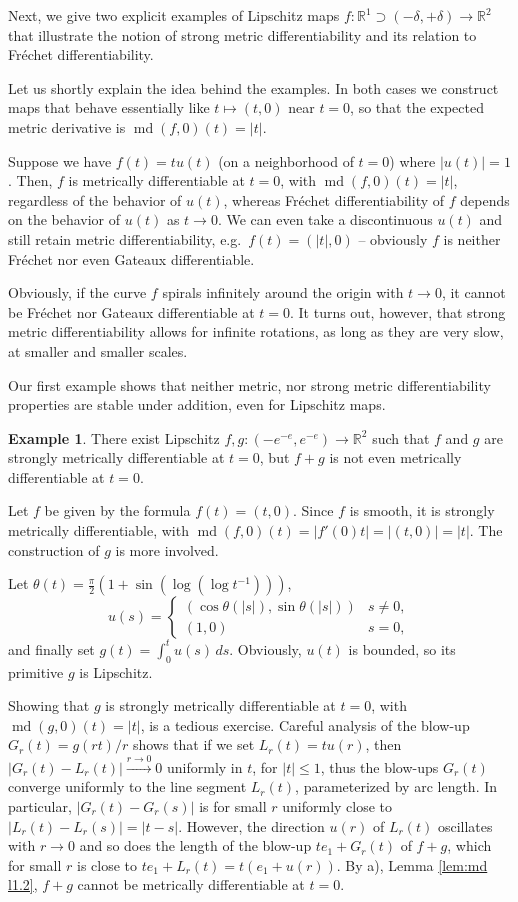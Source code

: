\documentclass[12pt,leqno]{amsart}
\theoremstyle{definition}
\newtheorem{example}[theorem]{Example}
\newcommand{\bbbr}{\mathbb R}
\def\md{\operatorname{md}}
\numberwithin{theorem}{section} \numberwithin{equation}{section}
\begin{document}
Next, we give two explicit examples of Lipschitz maps $f: \mathbb R^1 \supset (-\delta,+\delta) \to \mathbb R^2$ that illustrate the notion of strong metric differentiability and its relation to Fr\'echet differentiability.

Let us shortly explain the idea behind the examples. In both cases we construct maps that behave essentially like $t\mapsto (t,0)$ near $t=0$, so that the expected metric derivative is $\md(f,0)(t)=|t|$.

Suppose we have $f(t)=t u(t)$ (on a neighborhood of $t=0$) where $|u(t)|=1$. Then, $f$ is metrically differentiable at $t=0$, with $\md(f,0)(t)=|t|$, regardless of the behavior of $u(t)$, whereas Fr\'echet differentiability of $f$ depends on the behavior of $u(t)$ as $t \to 0$. We can even take a discontinuous $u(t)$ and still retain metric differentiability, e.g.\ $f(t)=(|t|,0)$ -- obviously $f$ is neither Fr\'echet nor even Gateaux differentiable.

Obviously, if the curve $f$ spirals infinitely around the origin with $t\to 0$, it cannot be Fr\'echet nor Gateaux differentiable at $t=0$.  It turns out, however, that strong metric differentiability allows for infinite rotations, as long as they are very slow, at smaller and smaller scales.

Our first example shows that
neither metric, nor strong metric differentiability properties are stable under addition, even for Lipschitz maps.
\begin{example}
There exist Lipschitz $f,g:(-e^{-e},e^{-e})\to\bbbr^2$ such that $f$ and $g$ are strongly metrically differentiable at $t=0$, but $f+g$ is not even metrically differentiable at $t=0$.

Let $f$ be given by the formula $f(t)=(t,0)$. Since $f$ is smooth, it is strongly metrically differentiable, with $\md(f,0)(t)=|f'(0)t|=|(t,0)|=|t|$.
    The construction of $g$ is more involved.

    Let $\theta(t)=\frac{\pi}{2}(1+\sin(\log(\log t^{-1})))$,
    $$
    u(s)=\begin{cases}\left(\cos\theta(|s|),\sin \theta(|s|)\right) & s\neq 0,\\
    (1,0) &s=0,\end{cases}
    $$
    and finally set $g(t)=\int_0^t u(s)\,ds$. Obviously, $u(t)$ is bounded, so its primitive $g$ is Lipschitz.

Showing that $g$ is strongly metrically differentiable at $t=0$, with $\md(g,0)(t)=|t|$, is a tedious exercise.  Careful analysis of the blow-up $G_r(t)=g(rt)/r$ shows that if we set $L_r(t)=tu(r)$, then $|G_r(t)-L_r(t)|\xrightarrow{r\to 0}0$ uniformly in $t$, for $|t|\leq 1$, thus the blow-ups $G_r(t)$ converge uniformly to the line segment $L_r(t)$, parameterized by arc length. In particular, $|G_r(t)-G_r(s)|$ is for small $r$ uniformly close to $|L_r(t)-L_r(s)|=|t-s|$. However, the direction $u(r)$ of $L_r(t)$ oscillates with $r\to 0$ and so does the length of the blow-up $te_1+G_r(t)$ of $f+g$, which for small $r$ is close to $te_1+L_r(t)=t(e_1+u(r))$. By a), Lemma \ref{lem:md l1.2}, $f+g$ cannot be metrically differentiable at $t=0$.
\end{example}
\end{document}
